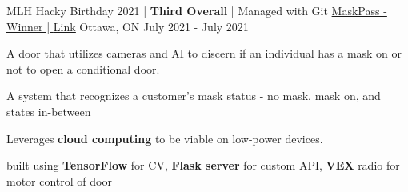 \begin{cventries}
  \cventry
    {MLH Hacky Birthday 2021 | \textbf{Third Overall} | Managed with Git} %
    {\underline{MaskPass - Winner | \href{https://devpost.com/software/mlh-birthday-ads}{Link}}} %
    {Ottawa, ON} %
    {July 2021 - July 2021} %
    {
      \begin{cvitems} %
        \item {A door that utilizes cameras and AI to discern if an individual has a mask on or not to open a conditional door.}
        \item {A system that recognizes a customer’s mask status - no mask, mask on, and states in-between}
        \item {Leverages \textbf{cloud computing} to be viable on low-power devices.}
        \item {built using \textbf{TensorFlow} for CV, \textbf{Flask server} for custom API, \textbf{VEX} radio for motor control of door}
      \end{cvitems}
    }

\end{cventries}
